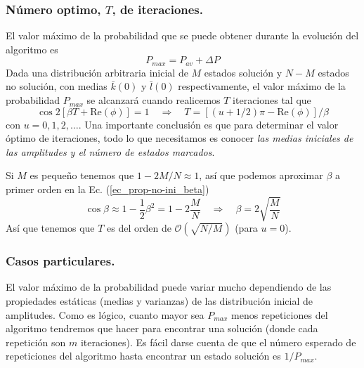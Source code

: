 \documentclass[a4paper,11pt]{article} %
\numberwithin{equation}{section}
\def\lc{\left[}
\def\rc{\right]}
\def\rqa{\quad \Rightarrow \quad}
\begin{document}
\subsubsection{Número optimo, $T$, de iteraciones.} \label{subsec_prop-no-uni_T}

El valor máximo de la probabilidad que se puede obtener durante la evolución del algoritmo es
\begin{equation}
P_{max}=P_{av} + \Delta P
\end{equation}
Dada una distribución arbitraria inicial de $M$ estados solución y $N-M$ estados no solución, con medias $\bar{k}(0)$ y $\bar{l}(0)$ respectivamente, el valor máximo de la probabilidad $P_{max}$ se alcanzará cuando realicemos $T$ iteraciones tal que
\begin{equation} \label{ec_prop-no-uni_T}
\cos 2 \lc \beta T + \text{Re} (\phi) \rc =1 \rqa 
\boxed{T = \lc (u + 1/2)  \pi - \text{Re} (\phi) \rc/\beta}
\end{equation}
con $u = 0,1,2,\dots$. Una importante conclusión es que para determinar el valor óptimo de iteraciones, todo lo que necesitamos es conocer \textit{las medias iniciales de las amplitudes y el número de estados marcados}.

Si $M$ es pequeño tenemos que $1-2M/N \approx 1$, así que podemos aproximar $\beta$ a primer orden en la Ec. (\ref{ec_prop-no-ini_beta})
\begin{equation}
\cos \beta \approx 1 - \frac{1}{2} \beta^2 = 1- 2 \frac{M}{N} \rqa \beta = 2 \sqrt{\frac{M}{N}}
\end{equation}
Así que tenemos que $T$ es del orden de $\mathcal{O}(\sqrt{N/M})$ (para $u=0$).

\subsubsection{Casos particulares.} \label{subsec_prop-no-uni_casos-particulares}

El valor máximo de la probabilidad puede variar mucho dependiendo de las propiedades estáticas (medias y varianzas) de las distribución inicial de amplitudes. Como es lógico, cuanto mayor sea $P_{max}$ menos repeticiones del algoritmo tendremos que hacer para encontrar una solución (donde cada repetición son $m$ iteraciones). Es fácil darse cuenta de que el número esperado de repeticiones del algoritmo hasta encontrar un estado solución es $1/P_{max}$.
\end{document}
